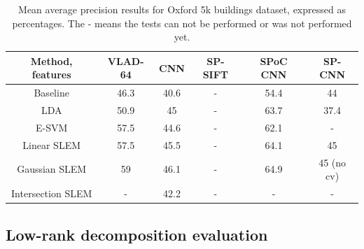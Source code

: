 \begin{table}[t]
\begin{center}
\begin{tabular}{|c|c|c|c|c|c|}
\hline
Method, features & VLAD-64 \cite{VLAD}& CNN \cite{jia2014caffe} & SP-SIFT \cite{spk} & SPoC CNN \cite{babenko15} &  SP-CNN \cite{SPPCNN} \\
\hline\hline
Baseline            & 46.3 & 40.6 & - & 54.4 & 44 \\
LDA                 & 50.9 & 45   & - & 63.7 & 37.4\\
E-SVM               & 57.5 & 44.6 & - & 62.1 & - \\
Linear SLEM         & 57.5 & 45.5 & - & 64.1 & 45 \\
Gaussian SLEM       & 59   & 46.1 & - & 64.9 & 45 (no cv) \\
Intersection SLEM   & -    & 42.2 & - & -    & - \\
\hline
\end{tabular}
\end{center}
\caption{Mean average precision results for Oxford 5k buildings dataset, expressed as percentages. The - means the tests can not be performed or was not performed yet.}
\end{table}


\subsection{Low-rank decomposition evaluation}


